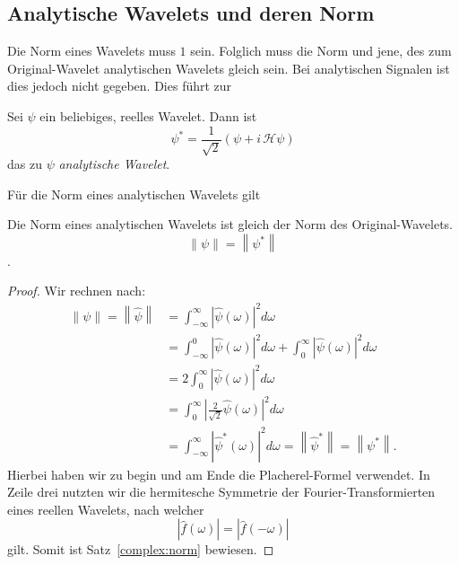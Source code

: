 \subsection{Analytische Wavelets und deren Norm}

Die Norm eines Wavelets muss $1$ sein.
Folglich muss die Norm und jene, des zum Original-Wavelet analytischen Wavelets gleich sein.
Bei analytischen Signalen ist dies jedoch nicht gegeben.
Dies führt zur
\begin{definition}
	Sei $\psi$ ein beliebiges, reelles Wavelet. Dann ist
	\begin{equation}
		\psi^\ast = \frac{1}{\sqrt{2}}\left(\psi + i\,\mathcal{H}\psi\right) \label{complex:anawave}
	\end{equation}
	das zu $\psi$ \emph{analytische Wavelet}.
\end{definition}

Für die Norm eines analytischen Wavelets gilt
\begin{satz}
	\label{complex:norm}
	Die Norm eines analytischen Wavelets ist gleich der Norm des Original-Wavelets.
	\[\left\|\psi\right\| = \left\|\psi^\ast\right\|\].
\end{satz}

\begin{proof}
	Wir rechnen nach:
	\begin{align*}
		\left\|\psi\right\| = \left\|\hat{\psi}\right\|
		&= \int_{-\infty}^{\infty}\left|\hat{\psi}(\omega)\right|^2 d\omega \\
		&= \int_{-\infty}^{0}\left|\hat{\psi}(\omega)\right|^2 d\omega +  \int_{0}^{\infty}\left|\hat{\psi}(\omega)\right|^2 d\omega \\
		&=  2\int_{0}^{\infty}\left|\hat{\psi}(\omega)\right|^2 d\omega \\
		&=  \int_{0}^{\infty}\left|\frac{2}{\sqrt{2}}\hat{\psi}(\omega)\right|^2 d\omega \\
		&=  \int_{-\infty}^{\infty}\left|\hat{\psi}^\ast(\omega)\right|^2 d\omega 
		= \left\|\hat{\psi}^\ast\right\| = \left\|\psi^\ast\right\|.
	\end{align*}
	Hierbei haben wir zu begin und am Ende die Placherel-Formel verwendet.
	In Zeile drei nutzten wir die hermitesche Symmetrie der Fourier-Transformierten eines reellen Wavelets, nach welcher
	\[\left|\hat{f}(\omega)\right| = \left|\hat{f}(-\omega)\right|\]
	gilt.
	Somit ist Satz~\ref{complex:norm} bewiesen.
\end{proof}
